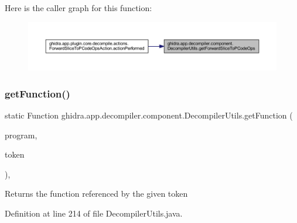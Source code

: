 Here is the caller graph for this function\+:
\nopagebreak
\begin{figure}[H]
\begin{center}
\leavevmode
\includegraphics[width=350pt]{classghidra_1_1app_1_1decompiler_1_1component_1_1_decompiler_utils_a8d0973ddd8181bb7afe7a696f91bd116_icgraph}
\end{center}
\end{figure}
\mbox{\label{classghidra_1_1app_1_1decompiler_1_1component_1_1_decompiler_utils_a57a704c884b7f65374e0390f5e101084}} 
\subsubsection{\texorpdfstring{getFunction()}{getFunction()}}
{\footnotesize\ttfamily static Function ghidra.\+app.\+decompiler.\+component.\+Decompiler\+Utils.\+get\+Function (\begin{DoxyParamCaption}\item[{Program}]{program,  }\item[{\mbox{\hyperlink{classghidra_1_1app_1_1decompiler_1_1_clang_func_name_token}{Clang\+Func\+Name\+Token}}}]{token }\end{DoxyParamCaption})\hspace{0.3cm}{\ttfamily [inline]}, {\ttfamily [static]}}

\begin{DoxyReturn}{Returns}
the function referenced by the given token 
\end{DoxyReturn}


Definition at line 214 of file Decompiler\+Utils.\+java.

